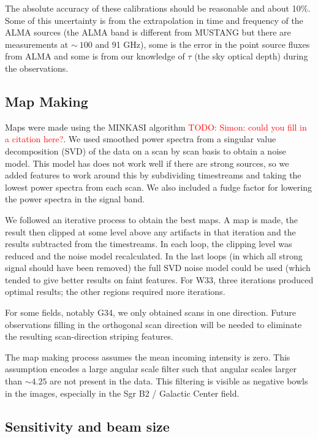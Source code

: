 \documentclass[twocolumn]{aastex62}
\def\todo#1{{\textcolor{red}{TODO: #1}}}
\begin{document}
The absolute accuracy of these calibrations should be reasonable and about 10\%.
Some of this uncertainty is from the extrapolation in time and frequency of the ALMA
sources (the ALMA band is different from MUSTANG but there are measurements at
$\sim~100$ and 91 GHz), some is the error in the point source fluxes from ALMA and
some is from our knowledge of $\tau$ (the sky optical depth) during the observations.

\subsection{Map Making}
Maps were made using the MINKASI algorithm \citep{}\todo{Simon: could you fill in a citation here?}.
We used smoothed power spectra from a singular value decomposition (SVD) of the data on a scan by scan basis to
obtain a noise model.
This model has does not work well if there are strong sources,
so we added features to work around this by subdividing timestreams and taking
the lowest power spectra from each scan.  We also included a fudge factor for
lowering the power spectra in the signal band.

We followed an iterative process to obtain the best maps.  A map is made, the
result then clipped at some level above any artifacts in that iteration and the
results subtracted from the timestreams.  In each loop, the clipping level was
reduced and the noise model recalculated.  In the last loops (in which all
strong signal should have been removed) the full SVD noise model could be used
(which tended to give better results on faint features. For W33, three
iterations produced optimal results; the other regions required more
iterations.

For some fields, notably G34, we only obtained scans in one direction.  Future
observations filling in the orthogonal scan direction will be needed to eliminate
the resulting scan-direction striping features.

The map making process assumes the mean incoming intensity is zero.  This assumption
encodes a large angular scale filter such that angular scales larger than $\sim4.25$\arcmin
are not present in the data.  This filtering is visible as negative bowls in the images,
especially in the Sgr B2 / Galactic Center field.

\subsection{Sensitivity and beam size}
\end{document}
